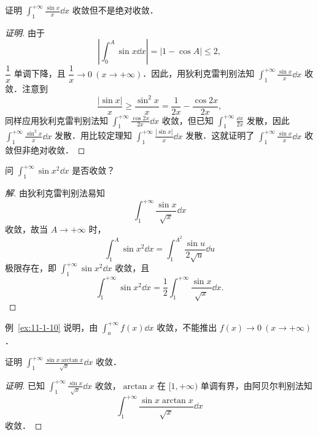 \begin{example}\label{ex:11-1-9}
证明 $\displaystyle\int_{1}^{+\infty}\frac{\sin x}{x}\dd x$ 收敛但不是绝对收敛．
\end{example}

\begin{proof}[证明]
由于
\[
\left|\int_{0}^{A}\sin x\dd x\right|=\left|1-\cos A\right|\leqslant 2,
\]
$\dfrac{1}{x}$ 单调下降，且 $\dfrac{1}{x}\to 0\ (x\to+\infty)$．因此，用狄利克雷判别法知 $\displaystyle\int_{1}^{+\infty}\frac{\sin x}{x}\dd x$ 收敛．注意到
\[
\frac{\left|\sin x\right|}{x}\geqslant\frac{\sin^{2}x}{x}=\frac{1}{2x}-\frac{\cos 2x}{2x},
\]
同样应用狄利克雷判别法知 $\displaystyle\int_{1}^{+\infty}\frac{\cos 2x}{2x}\dd x$ 收敛，但已知 $\displaystyle\int_{1}^{+\infty}\frac{\dd x}{2x}$ 发散，因此 $\displaystyle\int_{1}^{+\infty}\frac{\sin^{2}x}{x}\dd x$ 发散．用比较定理知 $\displaystyle\int_{1}^{+\infty}\frac{\left|\sin x\right|}{x}\dd x$ 发散．这就证明了 $\displaystyle\int_{1}^{+\infty}\frac{\sin x}{x}\dd x$ 收敛但非绝对收敛．
\end{proof}

\begin{example}\label{ex:11-1-10}
问 $\displaystyle\int_{1}^{+\infty}\sin x^{2}\dd x$ 是否收敛？
\end{example}

\begin{proof}[解]
由狄利克雷判别法易知
\[
\int_{1}^{+\infty}\frac{\sin x}{\sqrt{x}}\dd x
\]
收敛，故当 $A\to+\infty$ 时，
\[
\int_{1}^{A}\sin x^{2}\dd x=\int_{1}^{A^{2}}\frac{\sin u}{2\sqrt{u}}\dd u
\]
极限存在，即 $\displaystyle\int_{1}^{+\infty}\sin x^{2}\dd x$ 收敛，且
\[
\int_{1}^{+\infty}\sin x^{2}\dd x=\frac{1}{2}\int_{1}^{+\infty}\frac{\sin x}{\sqrt{x}}\dd x.
\]
\end{proof}

例~\ref{ex:11-1-10} 说明，由 $\displaystyle\int_{a}^{+\infty}f(x)\dd x$ 收敛，不能推出 $f(x)\to 0\ (x\to+\infty)$．

\begin{example}\label{ex:11-1-11}
证明 $\displaystyle\int_{1}^{+\infty}\frac{\sin x\arctan x}{\sqrt{x}}\dd x$ 收敛．
\end{example}

\begin{proof}[证明]
已知 $\displaystyle\int_{1}^{+\infty}\frac{\sin x}{\sqrt{x}}\dd x$ 收敛，$\arctan x$ 在 $[1,+\infty)$ 单调有界，由阿贝尔判别法知
\[
\int_{1}^{+\infty}\frac{\sin x\arctan x}{\sqrt{x}}\dd x
\]
收敛．
\end{proof}

